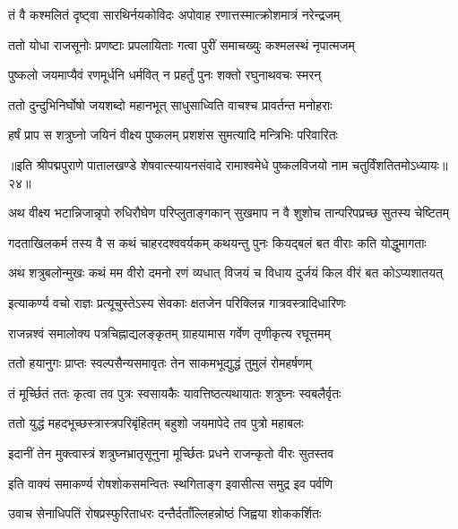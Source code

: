 \twolineshloka
{तं वै कश्मलितं दृष्ट्वा सारथिर्नयकोविदः}
{अपोवाह रणात्तस्मात्क्रोशमात्रं नरेन्द्रजम्}%

\twolineshloka
{ततो योधा राजसूनोः प्रणष्टाः प्रपलायिताः}
{गत्वा पुरीं समाचख्युः कश्मलस्थं नृपात्मजम्}%

\twolineshloka
{पुष्कलो जयमाप्यैवं रणमूर्धनि धर्मवित्}
{न प्रहर्तुं पुनः शक्तो रघुनाथवचः स्मरन्}%

\twolineshloka
{ततो दुन्दुभिनिर्घोषो जयशब्दो महानभूत्}
{साधुसाध्विति वाचश्च प्रावर्तन्त मनोहराः}%

\twolineshloka
{हर्षं प्राप स शत्रुघ्नो जयिनं वीक्ष्य पुष्कलम्}
{प्रशशंस सुमत्यादि मन्त्रिभिः परिवारितः}%

॥इति श्रीपद्मपुराणे पातालखण्डे शेषवात्स्यायनसंवादे रामाश्वमेधे पुष्कलविजयो नाम चतुर्विंशतितमोऽध्यायः॥२४॥



\twolineshloka
{अथ वीक्ष्य भटान्निजान्नृपो रुधिरौघेण परिप्लुताङ्गकान्}
{सुखमाप न वै शुशोच तान्परिपप्रच्छ सुतस्य चेष्टितम्}%

\twolineshloka
{गदताखिलकर्म तस्य वै स कथं चाहरदश्ववर्यकम्}
{कथयन्तु पुनः कियद्बलं बत वीराः कति योद्धुमागताः}%

\twolineshloka
{अथ शत्रुबलोन्मुखः कथं मम वीरो दमनो रणं व्यधात्}
{विजयं च विधाय दुर्जयं किल वीरं बत कोऽप्यशातयत्}%

\twolineshloka
{इत्याकर्ण्य वचो राज्ञः प्रत्यूचुस्तेऽस्य सेवकाः}
{क्षतजेन परिक्लिन्न गात्रवस्त्रादिधारिणः}%

\twolineshloka
{राजन्नश्वं समालोक्य पत्रचिह्नाद्यलङ्कृतम्}
{ग्राहयामास गर्वेण तृणीकृत्य रघूत्तमम्}%

\twolineshloka
{ततो हयानुगः प्राप्तः स्वल्पसैन्यसमावृतः}
{तेन साकमभूद्युद्धं तुमुलं रोमहर्षणम्}%

\twolineshloka
{तं मूर्च्छितं ततः कृत्वा तव पुत्रः स्वसायकैः}
{यावत्तिष्ठत्यथायातः शत्रुघ्नः स्वबलैर्वृतः}%

\twolineshloka
{ततो युद्धं महदभूच्छस्त्रास्त्रपरिबृंहितम्}
{बहुशो जयमापेदे तव पुत्रो महाबलः}%

\twolineshloka
{इदानीं तेन मुक्त्वास्त्रं शत्रुघ्नभ्रातृसूनुना}
{मूर्च्छितः प्रधने राजन्कृतो वीरः सुतस्तव}%

\twolineshloka
{इति वाक्यं समाकर्ण्य रोषशोकसमन्वितः}
{स्थगिताङ्ग इवासीत्स समुद्र इव पर्वणि}%

\twolineshloka
{उवाच सेनाधिपतिं रोषप्रस्फुरिताधरः}
{दन्तैर्दताँल्लिहन्नोष्ठं जिह्वया शोककर्शितः}%

